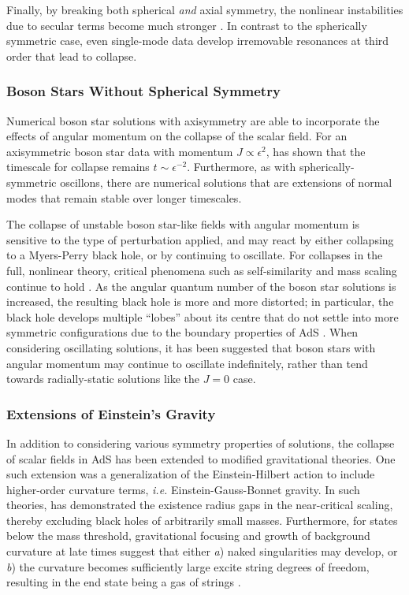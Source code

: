 Finally, by breaking both spherical \emph{and} axial symmetry, the nonlinear instabilities due to secular terms become much stronger \cite{1705.03065}. In contrast to the spherically symmetric case, even single-mode data develop irremovable resonances at third order that lead to collapse.

\subsubsection{Boson Stars Without Spherical Symmetry}

Numerical boson star solutions with axisymmetry are able to incorporate the effects of angular momentum on the collapse of the scalar field. For an axisymmetric boson star data with momentum $J \propto \epsilon^2$, \cite{1706.06101} has shown that the timescale for collapse remains $t \sim \epsilon^{-2}$. Furthermore, as with spherically-symmetric oscillons, there are numerical solutions that are extensions of normal modes that remain stable over longer timescales. 

The collapse of unstable boson star-like fields with angular momentum is sensitive to the type of perturbation applied, and may react by either collapsing to a Myers-Perry black hole, or by continuing to oscillate. For collapses in the full, nonlinear theory, critical phenomena such as self-similarity and mass scaling continue to hold \cite{gr-qc/0410040}. As the angular quantum number of the boson star solutions is increased, the resulting black hole is more and more distorted; in particular, the black hole develops multiple ``lobes'' about its centre that do not settle into more symmetric configurations due to the boundary properties of AdS \cite{1202.5809}. When considering oscillating solutions, it has been suggested that boson stars with angular momentum may continue to oscillate indefinitely, rather than tend towards radially-static solutions like the $J = 0$ case.

\subsubsection{Extensions of Einstein's Gravity}

In addition to considering various symmetry properties of solutions, the collapse of scalar fields in AdS has been extended to modified gravitational theories. One such extension was a generalization of the Einstein-Hilbert action to include higher-order curvature terms, {\it i.e.} Einstein-Gauss-Bonnet gravity. In such theories, \cite{1410.1869} has demonstrated the existence radius gaps in the near-critical scaling, thereby excluding black holes of arbitrarily small masses. Furthermore, for states below the mass threshold, gravitational focusing and growth of background curvature at late times suggest that either \emph{a}) naked singularities may develop, or \emph{b}) the curvature becomes sufficiently large excite string degrees of freedom, resulting in the end state being a gas of strings \cite{1608.05402}.


